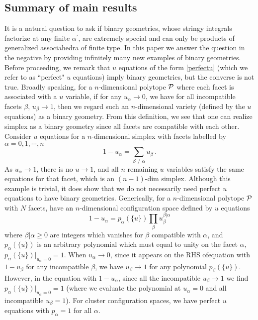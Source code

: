 \documentclass[hidelinks,12pt]{article}
\newcommand{\be}{\begin{equation}}
\newcommand{\ee}{\end{equation}}
\def\be{\begin{equation}}
\def\ee{\end{equation}}
\begin{document}
\subsection{Summary of main results}

It is a natural question to ask if binary geometries, whose stringy integrals factorize at any finite $\alpha^{'}$, are extremely special and can only be products of generalized associahedra of finite type. In this paper we answer the question in the negative by providing infinitely many new examples of binary geometries. Before proceeding, we remark that $u$ equations of the form \eqref{perfectu} (which we refer to as ``perfect" $u$ equations) imply binary geometries, but the converse is not true. Broadly speaking, for a $n$-dimensional polytope ${\cal P}$ where each facet is associated with a $u$ variable,  if for any $u_\alpha\to 0$, we have for all incompatible facets $\beta$, $u_\beta \to 1$, then we regard such an $n$-dimensional variety (defined by the $u$ equations) as a binary geometry. From this definition, we see that one can realize simplex as a binary geometry since all facets are compatible with each other. Consider $u$ equations for a $n$-dimensional simplex with facets labelled by $\alpha=0,1,\cdots, n$
\[
1-u_\alpha=\sum_{\beta \neq \alpha} u_\beta\,.
\] 
As $u_\alpha\to 1$, there is no $u\to 1$, and all $n$ remaining $u$ variables satisfy the same equations for that facet, which is an $(n{-}1)$-dim simplex. Although this example is trivial, it does show that we do not necessarily need perfect $u$ equations to have binary geometries. Generically, for a $n$-dimensional polytope ${\cal P}$ with $N$ facets,  have an $n$-dimensional configuration space defined by $u$ equations
\be\label{genueq}
1-u_\alpha=p_\alpha(\{u\}) \prod_\beta u_\beta^{\beta|\alpha} 
\ee
where $\beta |\alpha \geq 0$ are integers which vanishes for $\beta$ compatible with $\alpha$, and $p_\alpha(\{u\})$ is an arbitrary polynomial which must equal to unity on the facet $\alpha$, $p_\alpha (\{u\})|_{u_\alpha=0}=1$. When $u_\alpha \to 0$, since it appears on the RHS ofequation with $1-u_\beta$ for any incompatible $\beta$, we have $u_\beta\to 1$ for any polynomial $p_\beta (\{u\})$. However, in the equation with $1-u_\alpha$, since all the incompatible $u_\beta \to 1$ we find $p_\alpha (\{u\})|_{u_\alpha=0}=1$ (where we evaluate the polynomial at $u_\alpha=0$ and all incompatible $u_\beta=1$). For cluster configuration spaces, we have perfect $u$ equations with $p_\alpha=1$ for all $\alpha$.
\end{document}
